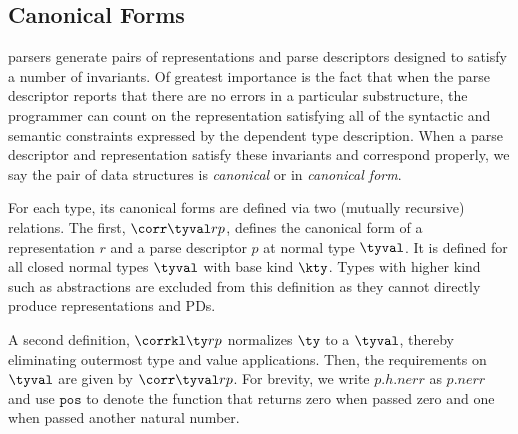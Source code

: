 \subsection{Canonical Forms}

\ddc{} parsers generate pairs of representations and parse descriptors
designed to satisfy a number of invariants.  Of greatest importance is
the fact that when the parse descriptor reports that there are no errors in a
particular substructure, the programmer can count on the
representation satisfying all of the syntactic and semantic
constraints expressed by the dependent \ddc{} type description.  When
a parse descriptor and representation satisfy these invariants and
correspond properly, we say the pair of data structures is {\em
  canonical} or in {\em canonical form}.

For each \ddc{} type, its canonical forms are defined via two
(mutually recursive) relations.  The first, $\corr \tyval r p$,
defines the canonical form of a representation $r$ and a parse
descriptor $p$ at normal type $\tyval$.  It is defined for all closed
normal types $\tyval$ with base kind $\kty$.  Types with higher kind
such as abstractions are excluded from this definition as they cannot
directly produce representations and PDs.

A second definition, $\corrkl \ty r p$ normalizes $\ty$ to a $\tyval$,
thereby eliminating outermost type and value applications. Then, the
requirements on $\tyval$ are given by $\corr \tyval r p$.  For
brevity, we write $p.h.{nerr}$ as $p.{nerr}$ and use $\mathtt{pos}$ to
denote the function that returns zero when passed zero and one when
passed another natural number.

